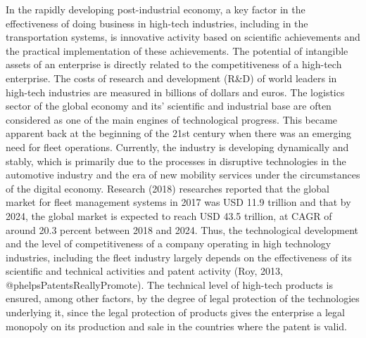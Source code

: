 \documentclass[12pt,twoside]{reedthesis}
\begin{document}
In the rapidly developing post-industrial economy, a key factor in the effectiveness of doing business in high-tech industries, including in the transportation systems, is innovative activity based on scientific achievements and the practical implementation of these achievements. The potential of intangible assets of an enterprise is directly related to the competitiveness of a high-tech enterprise. The costs of research and development (R\&D) of world leaders in high-tech industries are measured in billions of dollars and euros. The logistics sector of the global economy and its' scientific and industrial base are often considered as one of the main engines of technological progress. This became apparent back at the beginning of the 21st century when there was an emerging need for fleet operations. Currently, the industry is developing dynamically and stably, which is primarily due to the processes in disruptive technologies in the automotive industry and the era of new mobility services under the circumstances of the digital economy. Research (2018) researches reported that the global market for fleet management systems in 2017 was USD 11.9 trillion and that by 2024, the global market is expected to reach USD 43.5 trillion, at CAGR of around 20.3 percent between 2018 and 2024. Thus, the technological development and the level of competitiveness of a company operating in high technology industries, including the fleet industry largely depends on the effectiveness of its scientific and technical activities and patent activity (Roy, 2013, @phelpsPatentsReallyPromote). The technical level of high-tech products is ensured, among other factors, by the degree of legal protection of the technologies underlying it, since the legal protection of products gives the enterprise a legal monopoly on its production and sale in the countries where the patent is valid.
\end{document}
